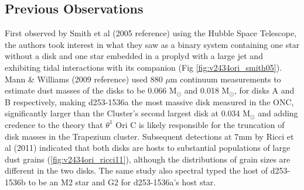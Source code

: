 \subsection{Previous Observations}

\begin{figure}[htp]
  \hspace*{\fill}%
  \hfill%
  \hfill%
  \hfill%
  \hspace*{\fill}%
\end{figure}

First observed by Smith et al (2005 reference) using the Hubble Space Telescope, the authors took interest in what they saw as a binary system containing one star without a disk and one star embedded in a proplyd with a large jet and exhibiting tidal interactions with its companion (Fig \ref{fig:v2434ori_smith05}). Mann \& Williams (2009 reference) used 880 $\mu$m continuum measurements to estimate dust masses of the disks to be 0.066 M$_{\odot}$ and 0.018 M$_{\odot}$, for disks A and B respectively, making d253-1536a the most massive disk measured in the ONC, significantly larger than the Cluster's second largest disk at 0.034 M$_\odot$ and adding credence to the theory that $\theta^1$ Ori C is likely responsible for the truncation of disk masses in the Trapezium cluster. Subsequent detections at 7mm by Ricci et al (2011) indicated that both disks are hosts to substantial populations of large dust grains (\ref{fig:v2434ori_ricci11}), although the distributions of grain sizes are different in the two disks. The same study also spectral typed the host of d253-1536b to be an M2 star and G2 for d253-1536a's host star.

